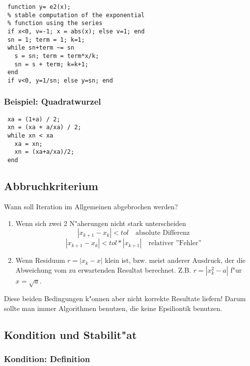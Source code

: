 \documentclass[german, 10pt, a4paper, twocolumn]{scrartcl}
\theoremstyle{definition}
\begin{document}
\small
\begin{verbatim}
 function y= e2(x);
 % stable computation of the exponential
 % function using the series
 if x<0, v=-1; x = abs(x); else v=1; end
 sn = 1; term = 1; k=1;
 while sn+term ~= sn
   s = sn; term = term*x/k;
   sn = s + term; k=k+1;
 end
 if v<0, y=1/sn; else y=sn; end
\end{verbatim}
\normalsize

\subsubsection{Beispiel: Quadratwurzel}

\small
\begin{verbatim}
 xa = (1+a) / 2;
 xn = (xa + a/xa) / 2;
 while xn < xa
   xa = xn;
   xn = (xa+a/xa)/2;
 end
\end{verbatim}
\normalsize

\subsection{Abbruchkriterium}

Wann soll Iteration im Allgemeinen abgebrochen werden?

\begin{enumerate}
	\item Wenn sich zwei 2 N"aherungen nicht stark unterscheiden
		\begin{displaymath}
			|x_{k+1} - x_k| < tol \quad \mbox{absolute Differenz}
		\end{displaymath}
		\begin{displaymath}
			|x_{k+1} - x_k| < tol*|x_{k+1}| \quad \mbox{relativer ''Fehler''}
		\end{displaymath}
	\item Wenn Residuum $r=|x_k - x|$ klein ist, bzw. meist anderer Ausdruck, der die Abweichung vom zu erwartenden Resultat berechnet. Z.B. $r=|x_k^2 -a|$ f"ur $x = \sqrt{a}$.
\end{enumerate}

Diese beiden Bedingungen k"onnen aber nicht korrekte Resultate liefern! Darum sollte man immer Algorithmen benutzen, die keine Epsiliontik benutzen.


\subsection{Kondition und Stabilit"at}

\subsubsection{Kondition: Definition}
\end{document}
